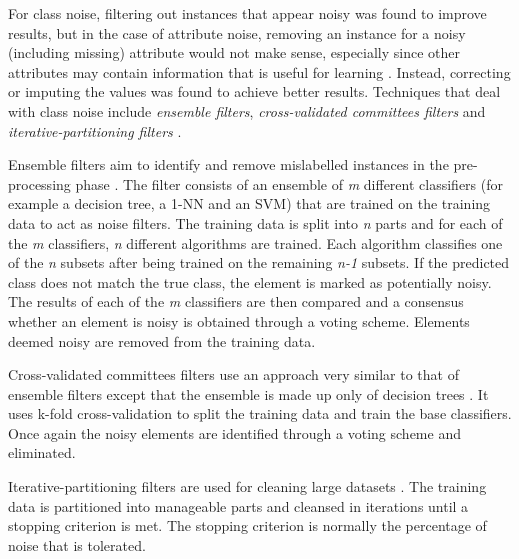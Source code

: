 For class noise, filtering out instances that appear noisy was found to improve results, but in the case of attribute noise, removing an instance for a noisy (including missing) attribute would not make sense, especially since other attributes may contain information that is useful for learning \citep{zhu2004class}. Instead, correcting or imputing the values was found to achieve better results. Techniques that deal with class noise include \textit{ensemble filters}, \textit{cross-validated committees filters} and \textit{iterative-partitioning filters} \citep{garcia2015data}.

Ensemble filters aim to identify and remove mislabelled instances in the pre-processing phase \citep{garcia2015data, brodley1999identifying}. The filter consists of an ensemble of \textit{m} different classifiers (for example a decision tree, a 1-NN and an SVM) that are trained on the training data to act as noise filters. The training data is split into \textit{n} parts and for each of the \textit{m} classifiers, \textit{n} different algorithms are trained. Each algorithm classifies one of the \textit{n} subsets after being trained on the remaining \textit{n-1} subsets. If the predicted class does not match the true class, the element is marked as potentially noisy. The results of each of the \textit{m} classifiers are then compared and a consensus whether an element is noisy is obtained through a voting scheme.  Elements deemed noisy are removed from the training data.

Cross-validated committees filters use an approach very similar to that of ensemble filters except that the ensemble is made up only of decision trees \citep{garcia2015data, verbaeten2003ensemble}. It uses k-fold cross-validation to split the training data and train the base classifiers. Once again the noisy elements are identified through a voting scheme and eliminated.

Iterative-partitioning filters are used for cleaning large datasets \citep{garcia2015data}. The training data is partitioned into manageable parts and cleansed in iterations until a stopping criterion is met. The stopping criterion is normally the percentage of noise that is tolerated.

